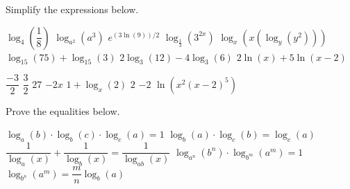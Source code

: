 \begin{Exercise} Simplify the expressions below.
\begin{multicols}{2}
	\Question[difficulty = 1] $\log_{4} \left( \dfrac{1}{8} \right)$ 
	\Question[difficulty = 1] $\log_{a^2} \left(a^3\right)$
	\Question[difficulty = 1] $e^{(3 \ln (9))/2}$ 
	\Question[difficulty = 1] $\log_{\frac{1}{3}} \left(3^{2x}\right)$ 
	\ifanalysis\Question[difficulty = 1]\fi\ifcalculus\Question[difficulty = 2]\fi $\log_{x} \left( x \left(\log_y \left(y^2\right) \right) \right)$ 
	\Question[difficulty = 1] $\log_{15} \left(75\right) + \log_{15}\left( 3\right)$ 
	\Question[difficulty = 1] $2\log_{3} \left(12\right) - 4\log_{3} \left(6\right)$ 
	\Question[difficulty = 1] $2 \ln(x) + 5 \ln (x-2) $ 
    \EndCurrentQuestion
\end{multicols}

\end{Exercise}

\begin{Answer}\phantom{}
    \begin{multicols}{2}

    	\Question $\dfrac{-3}{2}$ 
    	\Question $\dfrac{3}{2}$ 
    	\Question $27$  
    	\Question $-2x$ 
    	\Question $1+\log_x\left(2\right)$ 
    	\Question $2$ 
    	\Question $-2$ 
    	\Question $\ln \left(x^2 (x-2)^5 \right)$ 
    \EndCurrentQuestion
    \end{multicols}
\end{Answer}


\begin{Exercise} Prove the equalities below. 
\begin{multicols}{2}
	\Question[difficulty = 1] $\log_a (b)\cdot\log_b (c)\cdot\log_c (a)=1$
	\Question[difficulty = 1] $\log_b (a)\cdot\log_c (b)=\log_c (a)$
	\ifanalysis\Question[difficulty = 1]\fi\ifcalculus\Question[difficulty = 2]\fi $\dfrac{1}{\log_a(x)}+\dfrac{1}{\log_b(x)}=\dfrac{1}{\log_{ab}(x)}$
	\ifanalysis
	\Question[difficulty = 2] $\log_{a^n}(b^n) \cdot \log_{b^m}(a^m) = 1$
	\ifanalysis\Question[difficulty = 1]\fi\ifcalculus\Question[difficulty = 2]\fi $\log_{b^n}(a^m) = \dfrac{m}{n} \log_b (a) $ 
	\fi
	\EndCurrentQuestion
\end{multicols}
\end{Exercise}

